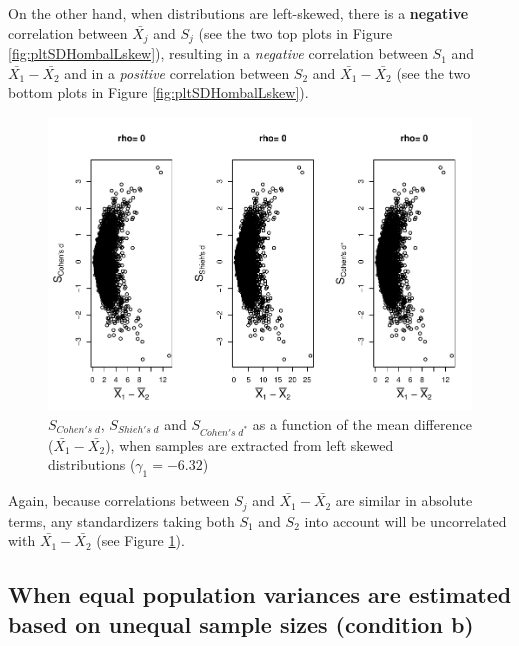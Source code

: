 \documentclass[
  english,
  man,mask]{apa6}
\begin{document}
On the other hand, when distributions are left-skewed, there is a \textbf{negative} correlation between \(\bar{X_j}\) and \(S_j\) (see the two top plots in Figure \ref{fig:pltSDHombalLskew}), resulting in a \emph{negative} correlation between \(S_1\) and \(\bar{X_1}-\bar{X_2}\) and in a \emph{positive} correlation between \(S_2\) and \(\bar{X_1}-\bar{X_2}\) (see the two bottom plots in Figure \ref{fig:pltSDHombalLskew}).

\begin{figure}
\centering
\includegraphics{Correlation_files/figure-latex/pltStdzrHombalLskew-1.pdf}
\caption{\label{fig:pltStdzrHombalLskew}\(S_{Cohen's \; d}\), \(S_{Shieh's \; d}\) and \(S_{Cohen's \; d^*}\) as a function of the mean difference (\(\bar{X_1}-\bar{X_2}\)), when samples are extracted from left skewed distributions (\(\gamma_1 = -6.32\))}
\end{figure}

Again, because correlations between \(S_j\) and \(\bar{X_1}-\bar{X_2}\) are similar in absolute terms, any standardizers taking both \(S_1\) and \(S_2\) into account will be uncorrelated with \(\bar{X_1}-\bar{X_2}\) (see Figure \ref{fig:pltStdzrHombalLskew}).

\hypertarget{when-equal-population-variances-are-estimated-based-on-unequal-sample-sizes-condition-b}{%
\subsection{When equal population variances are estimated based on unequal sample sizes (condition b)}\label{when-equal-population-variances-are-estimated-based-on-unequal-sample-sizes-condition-b}}
\end{document}
